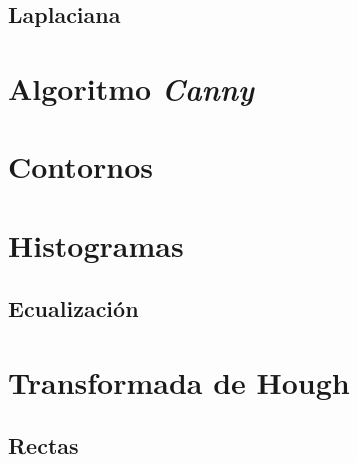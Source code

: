\subsection{Laplaciana}

\section{Algoritmo \emph{Canny}}

\section{Contornos}

\section{Histogramas}
\subsection{Ecualización}

\section{Transformada de Hough}
\subsection{Rectas}